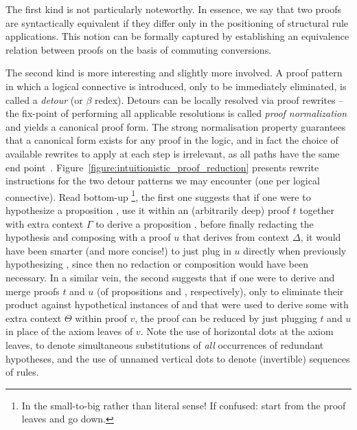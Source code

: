 The first kind is not particularly noteworthy.
In essence, we say that two proofs are syntactically equivalent if they differ only in the positioning of structural rule applications.
This notion can be formally captured by establishing an equivalence relation between proofs on the basis of commuting conversions.

The second kind is more interesting and slightly more involved.
A proof pattern in which a logical connective is introduced, only to be immediately eliminated, is called a \textit{detour} (or $\beta$ redex).
Detours can be locally resolved via proof rewrites -- the fix-point of performing all applicable resolutions is called \textit{proof normalization} and yields a canonical proof form. 
The strong normalisation property guarantees that a canonical form exists for any proof in the logic, and in fact the choice of available rewrites to apply at each step is irrelevant, as all paths have the same end point~\cite{groote1999strong}.
Figure~\ref{figure:intuitionistic_proof_reduction} presents rewrite instructions for the two detour patterns we may encounter (one per logical connective).
Read bottom-up%
\footnote{In the small-to-big rather than literal sense! If confused: start from the proof leaves and go down.},
the first one suggests that if one were to hypothesize a proposition , use it within an (arbitrarily deep) proof $t$ together with extra context $\Gamma$ to derive a proposition , before finally redacting the hypothesis and composing with a proof $u$ that derives  from context $\Delta$, it would have been smarter (and more concise!) to just plug in $u$ directly when previously hypothesizing , since then no redaction or composition would have been necessary.
In a similar vein, the second suggests that if one were to derive and merge proofs $t$ and $u$ (of propositions  and , respectively), only to eliminate their product against hypothetical instances of  and  that were used to derive some  with extra context $\Theta$ within proof $v$, the proof can be reduced by just plugging $t$ and $u$ in place of the axiom leaves of $v$.
Note the use of horizontal dots at the axiom leaves, to denote simultaneous substitutions of \textit{all} occurrences of redundant hypotheses, and the use of unnamed vertical dots to denote (invertible) sequences of \Contraction{} rules.


